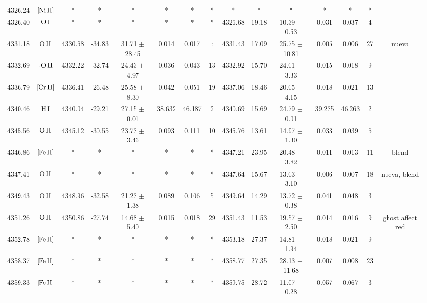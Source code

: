 \documentclass{article}
\begin{document}
\begin{table*}
\begin{adjustbox}{width=\textwidth}
\begin{tabular}{ccccccccccccccc}
4326.24 & $\mbox{[Ni}\thinspace \mbox{II]}$ & * & * & * & * & * & * & * & * & * & * & * & * &  \\
4326.40 & $\mbox{O}\thinspace \mbox{I}$ & * & * & * & * & * & * & 4326.68 & 19.18 & 10.39 $\pm$ 0.53 & 0.031 & 0.037 & 4 &  \\
4331.18 & $\mbox{O}\thinspace \mbox{II}$ & 4330.68 & -34.83 & 31.71 $\pm$ 28.45 & 0.014 & 0.017 & : & 4331.43 & 17.09 & 25.75 $\pm$ 10.81 & 0.005 & 0.006 & 27 &  nueva \\
4332.69 & $\mbox{-O}\thinspace \mbox{II}$ & 4332.22 & -32.74 & 24.43 $\pm$ 4.97 & 0.036 & 0.043 & 13 & 4332.92 & 15.70 & 24.01 $\pm$ 3.33 & 0.015 & 0.018 & 9 &  \\
4336.79 & $\mbox{[Cr}\thinspace \mbox{II]}$ & 4336.41 & -26.48 & 25.58 $\pm$ 8.30 & 0.042 & 0.051 & 19 & 4337.06 & 18.46 & 20.05 $\pm$ 4.15 & 0.018 & 0.021 & 13 &  \\
4340.46 & $\mbox{H}\thinspace \mbox{I}$ & 4340.04 & -29.21 & 27.15 $\pm$ 0.01 & 38.632 & 46.187 & 2 & 4340.69 & 15.69 & 24.79 $\pm$ 0.01 & 39.235 & 46.263 & 2 &  \\
4345.56 & $\mbox{O}\thinspace \mbox{II}$ & 4345.12 & -30.55 & 23.73 $\pm$ 3.46 & 0.093 & 0.111 & 10 & 4345.76 & 13.61 & 14.97 $\pm$ 1.30 & 0.033 & 0.039 & 6 &  \\
4346.86 & $\mbox{[Fe}\thinspace \mbox{II]}$ & * & * & * & * & * & * & 4347.21 & 23.95 & 20.48 $\pm$ 3.82 & 0.011 & 0.013 & 11 &  blend \\
4347.41 & $\mbox{O}\thinspace \mbox{II}$ & * & * & * & * & * & * & 4347.64 & 15.67 & 13.03 $\pm$ 3.10 & 0.006 & 0.007 & 18 &  nueva, blend \\
4349.43 & $\mbox{O}\thinspace \mbox{II}$ & 4348.96 & -32.58 & 21.23 $\pm$ 1.38 & 0.089 & 0.106 & 5 & 4349.64 & 14.29 & 13.72 $\pm$ 0.38 & 0.041 & 0.048 & 3 &  \\
4351.26 & $\mbox{O}\thinspace \mbox{II}$ & 4350.86 & -27.74 & 14.68 $\pm$ 5.40 & 0.015 & 0.018 & 29 & 4351.43 & 11.53 & 19.57 $\pm$ 2.50 & 0.014 & 0.016 & 9 &  ghost affect red \\
4352.78 & $\mbox{[Fe}\thinspace \mbox{II]}$ & * & * & * & * & * & * & 4353.18 & 27.37 & 14.81 $\pm$ 1.94 & 0.018 & 0.021 & 9 &  \\
4358.37 & $\mbox{[Fe}\thinspace \mbox{II]}$ & * & * & * & * & * & * & 4358.77 & 27.35 & 28.13 $\pm$ 11.68 & 0.007 & 0.008 & 23 &  \\
4359.33 & $\mbox{[Fe}\thinspace \mbox{II]}$ & * & * & * & * & * & * & 4359.75 & 28.72 & 11.07 $\pm$ 0.28 & 0.057 & 0.067 & 3 &  \\

\end{tabular}
\end{adjustbox}
\end{table*}
\end{document}
